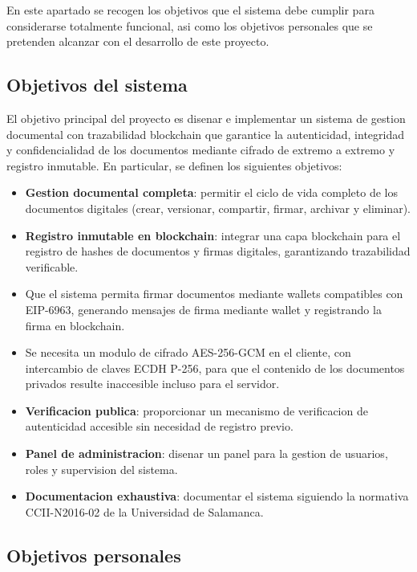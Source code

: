 \documentclass[11pt, a4paper]{article}
\begin{document}
En este apartado se recogen los objetivos que el sistema debe cumplir para considerarse totalmente funcional, asi como los objetivos personales que se pretenden alcanzar con el desarrollo de este proyecto.

\subsection{Objetivos del sistema}

El objetivo principal del proyecto es disenar e implementar un sistema de gestion documental con trazabilidad blockchain que garantice la autenticidad, integridad y confidencialidad de los documentos mediante cifrado de extremo a extremo y registro inmutable. En particular, se definen los siguientes objetivos:

\begin{itemize}
    \item \textbf{Gestion documental completa}: permitir el ciclo de vida completo de los documentos digitales (crear, versionar, compartir, firmar, archivar y eliminar).
    \item \textbf{Registro inmutable en blockchain}: integrar una capa blockchain para el registro de hashes de documentos y firmas digitales, garantizando trazabilidad verificable.
    \item Que el sistema permita firmar documentos mediante wallets compatibles con EIP-6963, generando mensajes de firma mediante wallet y registrando la firma en blockchain.
    \item Se necesita un modulo de cifrado AES-256-GCM en el cliente, con intercambio de claves ECDH P-256, para que el contenido de los documentos privados resulte inaccesible incluso para el servidor.
    \item \textbf{Verificacion publica}: proporcionar un mecanismo de verificacion de autenticidad accesible sin necesidad de registro previo.
    \item \textbf{Panel de administracion}: disenar un panel para la gestion de usuarios, roles y supervision del sistema.
    \item \textbf{Documentacion exhaustiva}: documentar el sistema siguiendo la normativa CCII-N2016-02 de la Universidad de Salamanca.
\end{itemize}

\subsection{Objetivos personales}
\end{document}
